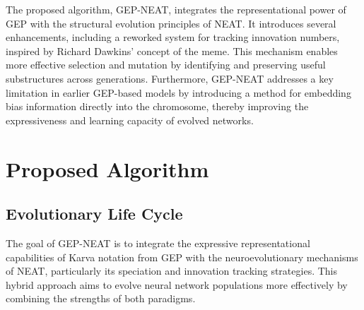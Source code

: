 \parbreak\noindent The proposed algorithm, GEP-NEAT, integrates the representational power of GEP with the structural evolution principles of NEAT. It introduces several enhancements, including a reworked system for tracking innovation numbers, inspired by Richard Dawkins' concept of the meme. This mechanism enables more effective selection and mutation by identifying and preserving useful substructures across generations. Furthermore, GEP-NEAT addresses a key limitation in earlier GEP-based models by introducing a method for embedding bias information directly into the chromosome, thereby improving the expressiveness and learning capacity of evolved networks.

\section{Proposed Algorithm}\label{sec:gep_neat_proposed_algorithm}
\subsection{Evolutionary Life Cycle}
The goal of GEP-NEAT is to integrate the expressive representational capabilities of Karva notation from GEP with the neuroevolutionary mechanisms of NEAT, particularly its speciation and innovation tracking strategies. This hybrid approach aims to evolve neural network populations more effectively by combining the strengths of both paradigms.

